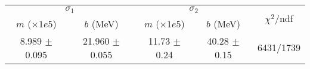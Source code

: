 \begin{tabular}{cc|cc||c}
\multicolumn{2}{c|}{$\sigma_1$} & \multicolumn{2}{|c}{$\sigma_2$} & \multirow{2}{*}{$\chi^2/$ndf} \\
$m$ ($\times1e5$) & $b$ (MeV) & $m$ ($\times1e5$) & $b$ (MeV) & \\
\hline
8.989 $\pm$ 0.095 & 21.960 $\pm$ 0.055 & 11.73 $\pm$ 0.24 & 40.28 $\pm$ 0.15 & 6431/1739\\
\end{tabular}
